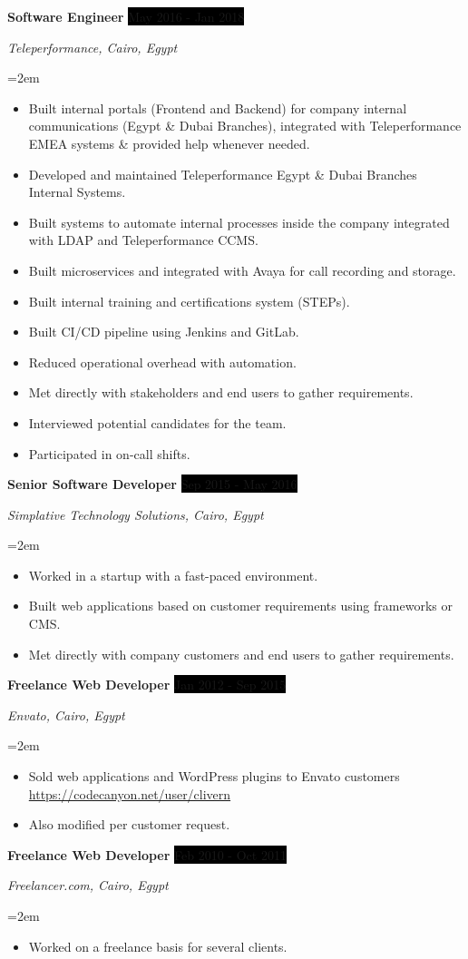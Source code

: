 \documentclass[paper=a4,fontsize=11pt]{scrartcl} %
\newcommand{\sepspace}{\vspace*{1em}}		%
\newcommand{\EducationEntry}[4]{
		\noindent \textbf{#1} \hfill      %
		\colorbox{Black}{%
			\parbox{6em}{%
			\hfill\color{White}#2}} \par  %
		\noindent \textit{#3} \par        %
		\noindent\hangindent=2em\hangafter=0 \small #4 %
		\normalsize \par}
\newcommand{\WorkEntry}[4]{				  %
		\noindent \textbf{#1} \hfill      %
		\colorbox{Black}{\color{White}#2} \par  %
		\noindent \textit{#3} \par              %
		\noindent\hangindent=2em\hangafter=0 \small #4 %
		\normalsize \par}
\begin{document}
\WorkEntry{Software Engineer}{May 2016 - Jan 2018}{Teleperformance, Cairo, Egypt}{\begin{itemize}
\item Built internal portals (Frontend and Backend) for company internal communications (Egypt \& Dubai Branches), integrated with Teleperformance EMEA systems \& provided help whenever needed.
\item Developed and maintained Teleperformance Egypt \& Dubai Branches Internal Systems.
\item Built systems to automate internal processes inside the company integrated with LDAP and Teleperformance CCMS.
\item Built microservices and integrated with Avaya for call recording and storage.
\item Built internal training and certifications system (STEPs).
\item Built CI/CD pipeline using Jenkins and GitLab.
\item Reduced operational overhead with automation.
\item Met directly with stakeholders and end users to gather requirements.
\item Interviewed potential candidates for the team.
\item Participated in on-call shifts.
\end{itemize}}
\sepspace

\WorkEntry{Senior Software Developer}{Sep 2015 - May 2016}{Simplative Technology Solutions, Cairo, Egypt}{\begin{itemize}
\item Worked in a startup with a fast-paced environment.
\item Built web applications based on customer requirements using frameworks or CMS.
\item Met directly with company customers and end users to gather requirements.
\end{itemize}}
\sepspace

\WorkEntry{Freelance Web Developer}{Jan 2012 - Sep 2015}{Envato, Cairo, Egypt}{\begin{itemize}
\item Sold web applications and WordPress plugins to Envato customers \url{https://codecanyon.net/user/clivern}
\item Also modified per customer request.
\end{itemize}}
\sepspace

\WorkEntry{Freelance Web Developer}{Feb 2010 - Oct 2011}{Freelancer.com, Cairo, Egypt}{\begin{itemize}
\item Worked on a freelance basis for several clients.
\end{itemize}}
\sepspace
\end{document}
